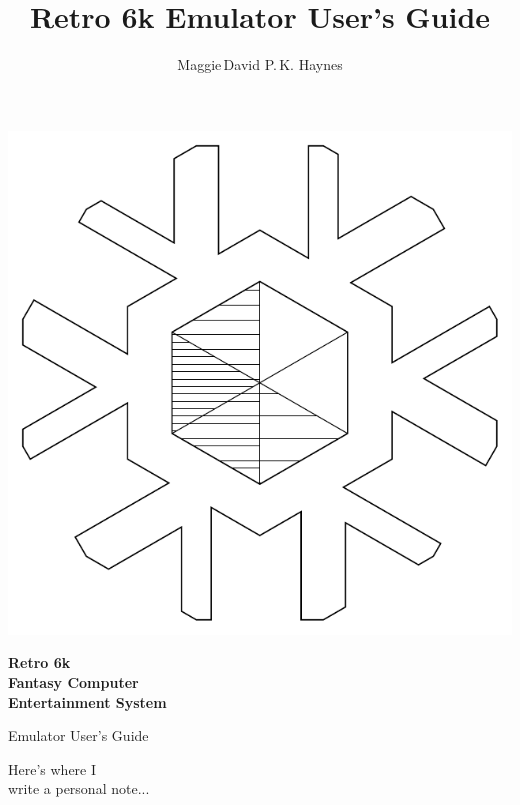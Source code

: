 \documentclass[12pt]{{memoir}}
\begin{document}
\title{Retro 6k Emulator User's Guide}
\author{Maggie\,David P.\,K. Haynes}
\pagestyle{empty}
\begin{center}
\includegraphics{../common-src/logolineart}

{\sffamily\bfseries\Huge{}Retro 6k\\Fantasy Computer\\Entertainment System

Emulator User's Guide\par}
{\sffamily\bfseries\large\theauthor\par}
\end{center}
\cleartoverso
{}
\begin{center}
\noindent{}Here's where I\\
write a personal note...\par
\end{center}

\cleartorecto
\tableofcontents*
\clearpage
\pagestyle{headings}
\end{document}
